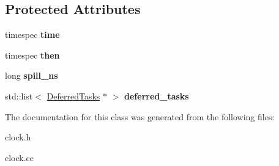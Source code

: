 \subsection*{Protected Attributes}
\begin{DoxyCompactItemize}
\item 
\hypertarget{classClock_a5bcbe67ab5e7401bb2aad2a404b9af73}{
timespec {\bfseries time}}
\label{classClock_a5bcbe67ab5e7401bb2aad2a404b9af73}

\item 
\hypertarget{classClock_a029c531061ff673036245dc49595929b}{
timespec {\bfseries then}}
\label{classClock_a029c531061ff673036245dc49595929b}

\item 
\hypertarget{classClock_a57d3bf1d0729b2595c55d9e3eb2df889}{
long {\bfseries spill\_\-ns}}
\label{classClock_a57d3bf1d0729b2595c55d9e3eb2df889}

\item 
\hypertarget{classClock_a6a93576eb5d034fc83fc631d2a436fd7}{
std::list$<$ \hyperlink{classClock_1_1DeferredTasks}{DeferredTasks} $\ast$ $>$ {\bfseries deferred\_\-tasks}}
\label{classClock_a6a93576eb5d034fc83fc631d2a436fd7}

\end{DoxyCompactItemize}


The documentation for this class was generated from the following files:\begin{DoxyCompactItemize}
\item 
clock.h\item 
clock.cc\end{DoxyCompactItemize}
